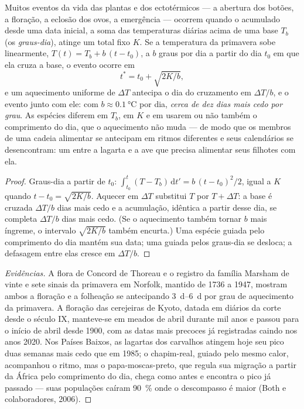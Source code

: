 \begin{theorem}\label{thm:b2:global-change:phenology}
Muitos eventos da vida das plantas e dos ectotérmicos --- a abertura dos
botões, a floração, a eclosão dos ovos, a emergência --- ocorrem quando
o \emph{} acumulado desde uma data inicial, a soma das
temperaturas diárias acima de uma base $T_b$ (os \emph{graus-dia}),
atinge um total fixo $K$. Se a temperatura da primavera sobe linearmente, $T(t) = T_b
+ b\,(t - t_0)$, a $b$ graus por dia a partir do dia $t_0$ em que ela
cruza a base, o evento ocorre em
\[
t^{*} = t_0 + \sqrt{2K/b},
\]
e um aquecimento uniforme de $\Delta T$ antecipa o dia do cruzamento
em $\Delta T/b$, e o evento junto com ele: com $b \approx
\qty{0.1}{\celsius}$ por dia, \emph{cerca de dez dias mais cedo por
grau}. As espécies diferem em $T_b$, em $K$ e em usarem ou não também o
comprimento do dia, que o aquecimento não muda --- de modo que os membros
de uma cadeia alimentar se antecipam em ritmos diferentes e seus
calendários se desencontram: um \emph{} entre a
lagarta e a ave que precisa alimentar seus filhotes com ela.
\end{theorem}
\begin{proof}
Graus-dia a partir de $t_0$: $\int_{t_0}^{t}(T - T_b)\,\mathrm{d}t' =
b\,(t - t_0)^{2}/2$, igual a $K$ quando $t - t_0 = \sqrt{2K/b}$.
Aquecer em $\Delta T$ substitui $T$ por $T + \Delta T$: a base é
cruzada $\Delta T/b$ dias mais cedo e a acumulação, idêntica a partir
desse dia, se completa $\Delta T/b$ dias mais cedo. (Se o aquecimento
também tornar $b$ mais íngreme, o intervalo $\sqrt{2K/b}$ também
encurta.) Uma espécie guiada pelo comprimento do dia mantém sua data;
uma guiada pelos graus-dia se desloca; a defasagem entre elas cresce em $\Delta T/b$.
\end{proof}
\begin{proof}[Evidências]
A flora de Concord de Thoreau e o registro da família Marsham de
vinte e sete sinais da primavera em Norfolk, mantido de 1736 a 1947,
mostram ambos a floração e a folheação se antecipando
\qtyrange{3}{6}{d} por grau de aquecimento da primavera. A floração das
cerejeiras de Kyoto, datada em diários da corte desde o século IX,
manteve-se em meados de abril durante mil anos e passou para o início de
abril desde 1900, com as datas mais precoces já registradas caindo nos
anos 2020. Nos Países Baixos, as lagartas dos carvalhos atingem hoje seu
pico duas semanas mais cedo que em 1985; o chapim-real, guiado pelo
mesmo calor, acompanhou o ritmo, mas o papa-moscas-preto, que regula sua
migração a partir da África pelo comprimento do dia, chega como antes e
encontra o pico já passado --- suas populações caíram \qty{90}{\%} onde o
descompasso é maior (Both e colaboradores, 2006).
\end{proof}

